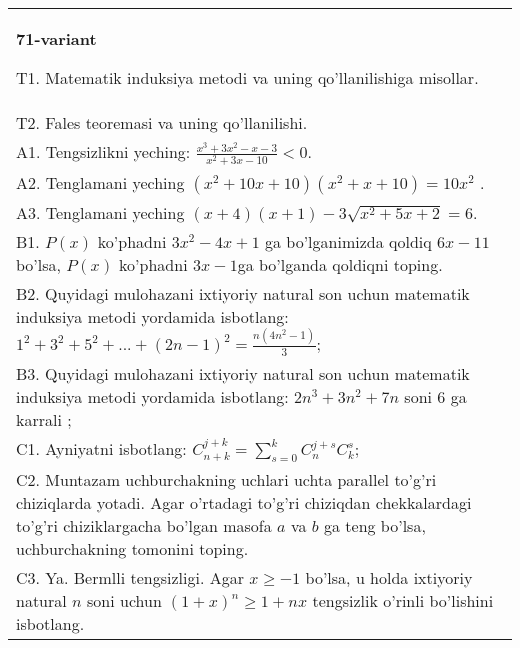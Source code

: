 \documentclass{article}
\begin{document}
\begin{tabular}{m{17cm}}
\textbf{71-variant}
\newline

T1. Matematik induksiya metodi va uning qo'llanilishiga misollar. \\
T2. Fales teoremasi va uning qo'llanilishi. \\
A1. Tengsizlikni yeching: \(\frac{x^{3} + 3x^{2} - x - 3}{x^{2} + 3x - 10} < 0\). \\
A2. Tenglamani yeching \(\left( x^{2} + 10x + 10 \right)\left( x^{2} + x + 10 \right) = 10x^{2}\) . \\
A3. Tenglamani yeching \((x + 4)(x + 1) - 3\sqrt{x^{2} + 5x + 2} = 6\). \\
B1. \(P(x)\) ko'phadni \(3x^{2} - 4x + 1\) ga bo'lganimizda qoldiq \(6x - 11\) bo'lsa, \(P(x)\) ko'phadni \(3x - 1\)ga bo'lganda qoldiqni toping. \\
B2. Quyidagi mulohazani ixtiyoriy natural son uchun matematik induksiya metodi yordamida isbotlang: \(1^{2} + 3^{2} + 5^{2} + ... + (2n - 1)^{2} = \frac{n\left( 4n^{2} - 1 \right)}{3}\); \\
B3. Quyidagi mulohazani ixtiyoriy natural son uchun matematik induksiya metodi yordamida isbotlang: \(2n^{3} + 3n^{2} + 7n\) soni 6 ga karrali ; \\
C1. Ayniyatni isbotlang: \(C_{n + k}^{j + k} = \sum_{s = 0}^{k}C_{n}^{j + s}C_{k}^{s}\); \\
C2. Muntazam uchburchakning uchlari uchta parallel to'g'ri chiziqlarda yotadi. Agar o'rtadagi to'g'ri chiziqdan chekkalardagi to'g'ri chiziklargacha bo'lgan masofa \(a\) va \(b\) ga teng bo'lsa, uchburchakning tomonini toping. \\
C3. Ya. Bermlli tengsizligi. Agar \(x \geq - 1\) bo'lsa, u holda ixtiyoriy natural \(n\) soni uchun \((1 + x)^{n} \geq 1 + nx\) tengsizlik o'rinli bo'lishini isbotlang. \\

\end{tabular}
\vspace{1cm}
\end{document}
